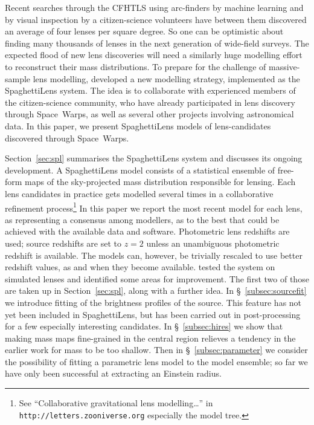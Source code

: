 Recent searches through the CFHTLS \citep{2012SPIE.8448E..0MC} using
arc-finders
\citep{2012ApJ...749...38M,2014A&A...567A.111M,2014ApJ...785..144G} by
machine learning \citep{2016arXiv160504309P} and by visual inspection
by a citizen-science volunteers
\citep[Space~Warps][]{2016MNRAS.455.1191M} have between them
discovered an average of four lenses per square degree.  So one can be
optimistic about finding many thousands of lenses in the next
generation of wide-field surveys.  The expected flood of new lens
discoveries will need a similarly huge modelling effort to
reconstruct their mass distributions.  To prepare for the challenge of
massive-sample lens modelling, \cite{2015MNRAS.447.2170K} developed a
new modelling strategy, implemented as the SpaghettiLens system.  The
idea is to collaborate with experienced members of the citizen-science
community, who have already participated in lens discovery through
Space~Warps, as well as several other projects involving astronomical
data.  In this paper, we present SpaghettiLens models of
lens-candidates discovered through Space~Warps.

Section~\ref{sec:spl} summarises the SpaghettiLens system and
discusses its ongoing development. A SpaghettiLens model consists of a
statistical ensemble of free-form maps of the sky-projected mass
distribution responsible for lensing.  Each lens candidates in
practice gets modelled several times in a collaborative refinement
process\footnote{See ``Collaborative gravitational lens
  modelling\dots'' in {\tt http://letters.zooniverse.org} especially
  the model tree.}  In this paper we report the most recent model for
each lens, as representing a consensus among modellers, as to the best
that could be achieved with the available data and software.
Photometric lens redshifts are used; source redshifts are set to
$z=2$ unless an unambiguous photometric redshift is available.
The models can, however, be trivially rescaled to use better
redshift values, as and when they become available.
\cite{2015MNRAS.447.2170K} tested the system on simulated lenses and
identified some areas for improvement.  The first two of those are
taken up in Section~\ref{sec:spl}, along with a further idea. In
\S~\ref{subsec:sourcefit} we introduce fitting of the brightness
profiles of the source.  This feature has not yet been included in
SpaghettiLens, but has been carried out in post-processing for a few
especially interesting candidates.  In \S~\ref{subsec:hires} we show
that making mass maps fine-grained in the central region relieves a
tendency in the earlier work for mass to be too shallow. Then in
\S~\ref{subsec:parameter} we consider the possibility of fitting a
parametric lens model to the model ensemble; so far we have only been
successful at extracting an Einstein radius.

